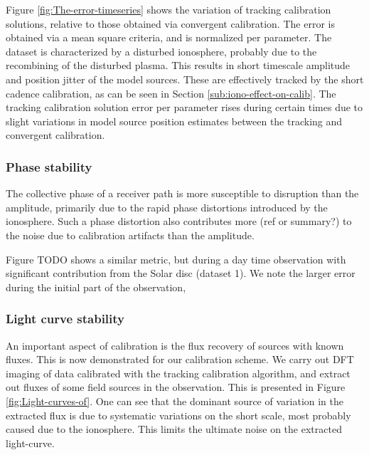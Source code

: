 \documentclass{aa}
\begin{document}
Figure   \ref{fig:The-error-timeseries}   shows   the  variation   of   tracking
calibration solutions,  relative to  those obtained via  convergent calibration.
The  error  is obtained  via  a  mean square  criteria,  and  is normalized  per
parameter. The dataset is characterized  by a disturbed ionosphere, probably due
to  the recombining of  the disturbed  plasma. This  results in  short timescale
amplitude  and position  jitter of  the  model sources.   These are  effectively
tracked  by  the   short  cadence  calibration,  as  can   be  seen  in  Section
\ref{sub:iono-effect-on-calib}.  The  tracking  calibration solution  error  per
parameter rises  during certain times due  to slight variations  in model source
position estimates between the tracking and convergent calibration.


\subsubsection{Phase stability}

The collective phase  of a receiver path is more  susceptible to disruption than
the amplitude,  primarily due to the  rapid phase distortions  introduced by the
ionosphere. Such a  phase distortion also contributes more  (ref or summary?) to
the noise due to calibration artifacts than the amplitude.

Figure  TODO shows  a similar  metric, but  during a  day time  observation with
significant contribution  from the  Solar disc (dataset  1). We note  the larger
error during the initial part of the observation,


\subsubsection{Light curve stability}

An important  aspect of calibration is  the flux recovery of  sources with known
fluxes. This is  now demonstrated for our calibration scheme.   We carry out DFT
imaging of data calibrated with  the tracking calibration algorithm, and extract
out  fluxes of  some field  sources in  the observation.   This is  presented in
Figure \ref{fig:Light-curves-of}. One can see that  the dominant source of variation in the extracted
flux is  due to systematic variations  on the short scale,  most probably caused
due  to  the  ionosphere.  This  limits  the ultimate  noise  on  the  extracted
light-curve.
\end{document}
